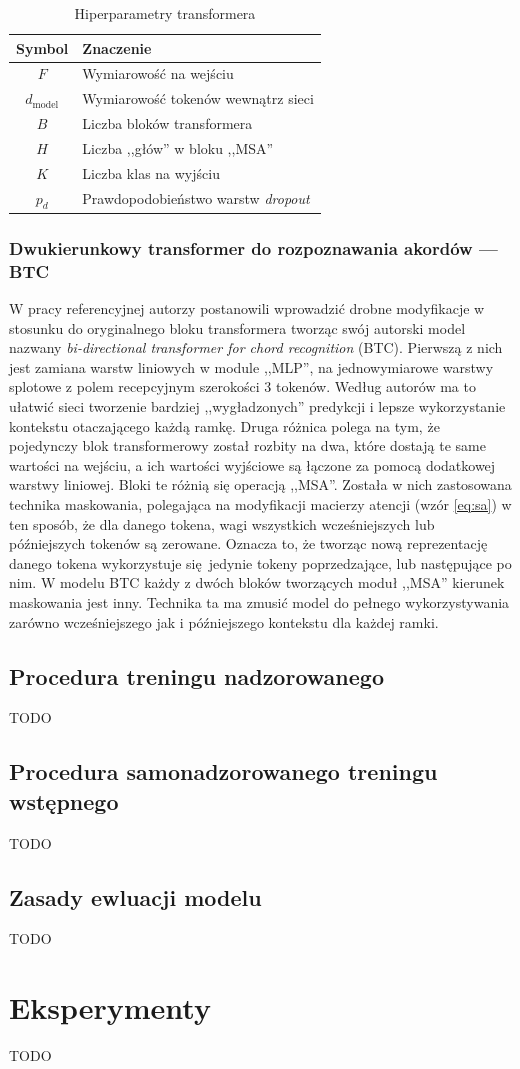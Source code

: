 \begin{table}
    \centering
    \caption{Hiperparametry transformera}
    \label{tab:transformer_params}
    \begin{tabular}{|c|l|} \hline
        Symbol & Znaczenie \\ \hline
        $F$ & Wymiarowość na wejściu \\
        $d_{\mathrm{model}}$ & Wymiarowość tokenów wewnątrz sieci \\
        $B$ & Liczba bloków transformera \\
        $H$ & Liczba ,,głów'' w bloku ,,MSA'' \\
        $K$ & Liczba klas na wyjściu \\
        $p_d$ & Prawdopodobieństwo warstw \emph{dropout} \\ \hline
    \end{tabular}
\end{table}

\subsubsection{Dwukierunkowy transformer do rozpoznawania akordów --- BTC}

W pracy referencyjnej \cite{park_bi-directional_2019} autorzy postanowili wprowadzić drobne
modyfikacje w stosunku do oryginalnego bloku transformera tworząc swój autorski model nazwany
\emph{bi-directional transformer for chord recognition} (BTC). Pierwszą z nich jest zamiana warstw
liniowych w module ,,MLP'', na jednowymiarowe warstwy splotowe z polem recepcyjnym szerokości 3
tokenów. Według autorów ma to ułatwić sieci tworzenie bardziej ,,wygładzonych'' predykcji i lepsze
wykorzystanie kontekstu otaczającego każdą ramkę. Druga różnica polega na tym, że pojedynczy blok
transformerowy został rozbity na dwa, które dostają te same wartości na wejściu, a ich wartości
wyjściowe są łączone za pomocą dodatkowej warstwy liniowej. Bloki te różnią się operacją ,,MSA''.
Została w nich zastosowana technika maskowania, polegająca na modyfikacji macierzy atencji (wzór
\ref{eq:sa}) w ten sposób, że dla danego tokena, wagi wszystkich wcześniejszych lub późniejszych
tokenów są zerowane. Oznacza to, że tworząc nową reprezentację danego tokena wykorzystuje
się jedynie tokeny poprzedzające, lub następujące po nim. W modelu BTC każdy z dwóch bloków
tworzących moduł ,,MSA'' kierunek maskowania jest inny. Technika ta ma zmusić model do pełnego
wykorzystywania zarówno wcześniejszego jak i późniejszego kontekstu dla każdej ramki.

\subsection{Procedura treningu nadzorowanego}
TODO

\subsection{Procedura samonadzorowanego treningu wstępnego}
TODO

\subsection{Zasady ewluacji modelu}
TODO


\section{Eksperymenty}
TODO
